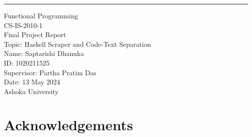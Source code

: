 \documentclass[12pt]{scrreprt}
\begin{document}













\begin{flushright}
    \rule{16cm}{5pt}\vskip1cm
    \begin{bfseries}
        \Huge{Functional Programming \\ CS-IS-2010-1 \\ Final Project Report }\\
        \vspace{1.1cm}
        Topic: Haskell Scraper and Code-Text Separation\\
        \vspace{1.1cm}
        Name: Saptarishi Dhanuka\\
        \vspace{1.1cm}
        ID: 1020211525\\
        \vspace{1.1cm}
        Supervisor: Partha Pratim Das\\
        \vspace{1.1cm}
        Date: 13 May 2024\\
        \vspace{1.1cm}
        Ashoka University\\
    \end{bfseries}
\end{flushright}


\newpage 


\tableofcontents

\newpage

\chapter{Acknowledgements}
\end{document}
